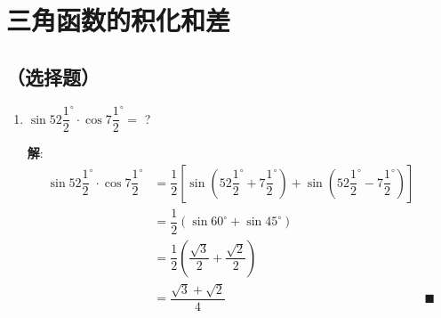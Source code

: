 \documentclass{report}
\newcommand{\sol}{\vspace{0.2cm}\textbf{解}:}
\begin{document}
\setcounter{chapter}{8}
\setcounter{section}{3}

\section{三角函数的积化和差}

\subsection*{（选择题）}

\allowdisplaybreaks
    \begin{enumerate}[leftmargin=*]
        \item $\sin 52 \dfrac{1}{2}^{\circ} \cdot \cos 7 \dfrac{1}{2}^{\circ}=$ ?
        
        \sol{}
        \begin{align*}
            \sin 52 \dfrac{1}{2}^{\circ} \cdot \cos 7 \dfrac{1}{2}^{\circ} &= \dfrac{1}{2} \left[\sin \left(52 \dfrac{1}{2}^{\circ}+7 \dfrac{1}{2}^{\circ}\right)+\sin \left(52 \dfrac{1}{2}^{\circ}-7 \dfrac{1}{2}^{\circ}\right)\right] \\
            &= \dfrac{1}{2} (\sin 60^{\circ}+\sin 45^{\circ}) \\
            &= \dfrac{1}{2} \left(\dfrac{\sqrt{3}}{2}+\dfrac{\sqrt{2}}{2}\right) \\
            &= \dfrac{\sqrt{3}+\sqrt{2}}{4} &\blacksquare
        \end{align*}
    \end{enumerate}
\end{document}

